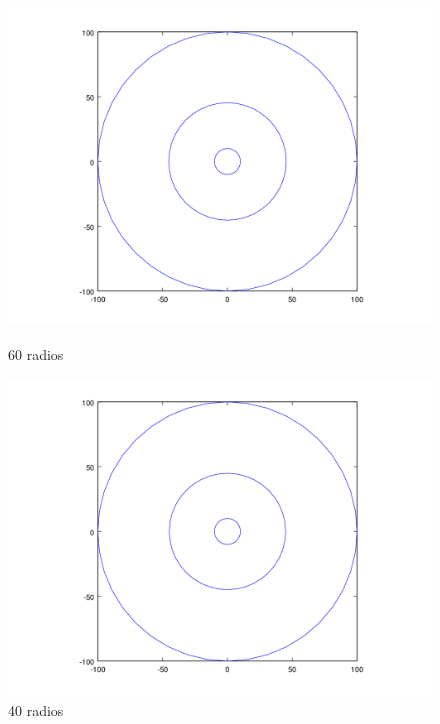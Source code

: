 \begin{figure}[H]
\centering
\begin{minipage}{0.30\textwidth}
  \centering
    \includegraphics[width=1\textwidth]{imgs/comp_rads_malo/comp_rads_iso5.png}
	\caption{60 radios}  
  \label{fig:Radios4}
\end{minipage}%
\hspace{0.03\textwidth}
\begin{minipage}{0.30\textwidth}   
  \centering
    \includegraphics[width=1\textwidth]{imgs/comp_rads_malo/comp_rads_iso3.png} 
	\caption{40 radios} 
  \label{fig:Radios5}
\end{minipage}
\hspace{0.03\textwidth}
\begin{minipage}{0.30\textwidth}   

\end{minipage}
\end{figure}
